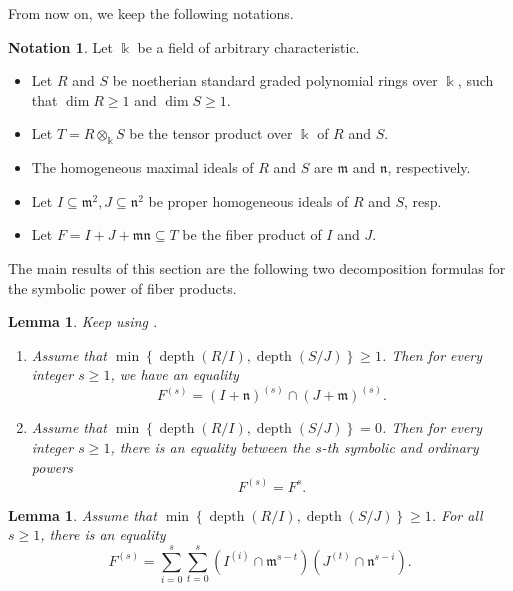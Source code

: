 \documentclass{amsart}
\DeclareMathOperator{\depth}{depth}
\newcommand{\mm}{\mathfrak{m}}
\newcommand{\nn}{\mathfrak{n}}
\theoremstyle{plain}
\newtheorem{lem}[thm]{Lemma}
\theoremstyle{definition}
\newtheorem{notn}[thm]{Notation}
\numberwithin{equation}{section}
\newcommand{\kk}{\Bbbk}
\begin{document}
From now on, we keep the following notations.
\begin{notn}
\label{notn_IandJ}
Let $\kk$ be a field of arbitrary characteristic. 
\begin{itemize}
 \item Let $R$ and $S$ be noetherian standard graded polynomial rings over $\kk$, such that $\dim R\ge 1$ and $\dim S\ge 1$.
 \item Let $T=R\otimes_{\kk}S$ be the tensor product over $\kk$ of $R$ and $S$. 
 \item The homogeneous maximal ideals of $R$ and $S$ are $\mathfrak{m}$ and $\mathfrak{n}$, respectively. 
 \item Let $I\subseteq \mm^2, J\subseteq \nn^2$ be proper homogeneous ideals of $R$ and $S$, resp. 
 \item Let $F=I+J+\mm \nn \subseteq T$ be the fiber product of $I$ and $J$.
\end{itemize}
\end{notn}
The main results of this section are the following two decomposition formulas for the symbolic power of fiber products.
\begin{lem} 
\label{lem_decomposition}
Keep using .
\begin{enumerate}[\quad \rm (1)]
 \item Assume that $\min\left\{\depth(R/I),\depth(S/J)\right \}\ge 1$.  Then for every integer $s\geq 1$, we have an equality 
$$
F^{(s)}=(I+\nn)^{(s)}\cap(J+\mm)^{(s)}.
$$
\item Assume that $\min\left\{\depth(R/I),\depth(S/J)\right \}=0$. Then for every integer $s\ge 1$, there is an equality between the $s$-th symbolic and ordinary powers
\[
F^{(s)}=F^s.
\]
\end{enumerate}
\end{lem}

\begin{lem}
\label{lem_decomposition_as_sum}
Assume that $\min\left\{\depth(R/I),\depth(S/J)\right \}\ge 1$. For all $s\ge 1$, there is an equality
\[
F^{(s)}= \sum_{i=0}^{s}\sum_{t=0}^{s}(I^{(i)}\cap \mm^{s-t})(J^{(t)}\cap \nn^{s-i}).
\]
\end{lem}
\end{document}
